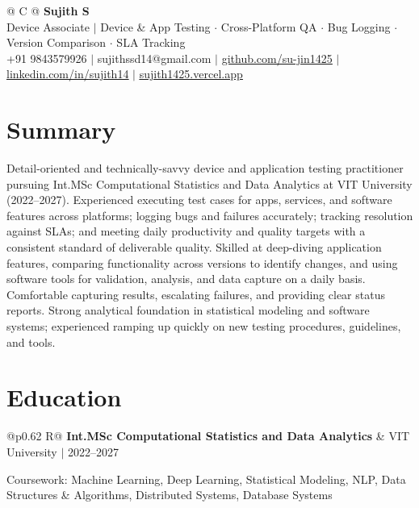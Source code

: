 \documentclass[a4paper,10pt]{article}
\newcommand{\ulink}[2]{\href{#1}{\uline{#2}}}
\newcommand{\subheading}[1]{{\color[HTML]{0A0A0A}\fontsize{12}{14}\selectfont\bfseries #1}}
\newcommand{\meta}[1]{{\color[HTML]{5C5C5C}\fontsize{10.5}{12.5}\selectfont #1}}
\begin{document}
\pagestyle{empty}

\begin{tabularx}{\linewidth}{@{} C @{}}
{\color[HTML]{000000}\fontsize{30}{35}\selectfont\bfseries Sujith S} \\[5pt]
{\fontsize{10.5}{12.5}\selectfont\color[HTML]{3A3A3A}
Device Associate $|$ Device \& App Testing $\cdot$ Cross-Platform QA $\cdot$ Bug Logging $\cdot$ Version Comparison $\cdot$ SLA Tracking} \\[6pt]
{\fontsize{10.5}{12.5}\selectfont\textcolor[HTML]{3A3A3A}{
+91 9843579926 $|$
sujithssd14@gmail.com $|$
\ulink{https://github.com/su-jin1425}{github.com/su-jin1425} $|$
\ulink{https://linkedin.com/in/sujith14}{linkedin.com/in/sujith14} $|$
\ulink{https://sujith1425.vercel.app}{sujith1425.vercel.app}}}
\end{tabularx}

\vspace{2pt}

\section{Summary}
\vspace{5pt}
{\color[HTML]{0A0A0A}\fontsize{11}{14}\selectfont
Detail-oriented and technically-savvy device and application testing practitioner pursuing Int.MSc Computational Statistics and Data Analytics at VIT University (2022--2027). Experienced executing test cases for apps, services, and software features across platforms; logging bugs and failures accurately; tracking resolution against SLAs; and meeting daily productivity and quality targets with a consistent standard of deliverable quality. Skilled at deep-diving application features, comparing functionality across versions to identify changes, and using software tools for validation, analysis, and data capture on a daily basis. Comfortable capturing results, escalating failures, and providing clear status reports. Strong analytical foundation in statistical modeling and software systems; experienced ramping up quickly on new testing procedures, guidelines, and tools.}

\vspace{2pt}

\section{Education}
\vspace{2pt}

\begin{tabularx}{\linewidth}{@{}p{0.62\linewidth} R@{}}
\subheading{Int.MSc Computational Statistics and Data Analytics} & \meta{VIT University $|$ 2022--2027}
\end{tabularx}
\vspace{1pt}
{\color[HTML]{3A3A3A}\fontsize{11}{14}\selectfont Coursework: Machine Learning, Deep Learning, Statistical Modeling, NLP, Data Structures \& Algorithms, Distributed Systems, Database Systems}
\end{document}
